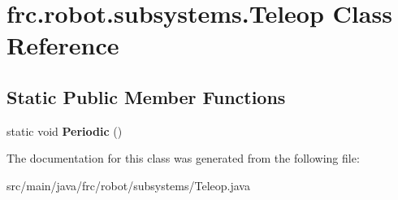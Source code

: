 \hypertarget{classfrc_1_1robot_1_1subsystems_1_1_teleop}{}\section{frc.\+robot.\+subsystems.\+Teleop Class Reference}
\label{classfrc_1_1robot_1_1subsystems_1_1_teleop}
\subsection*{Static Public Member Functions}
\begin{DoxyCompactItemize}
\item 
\mbox{\label{classfrc_1_1robot_1_1subsystems_1_1_teleop_ae90969b779b855da532e50706fa33401}} 
static void {\bfseries Periodic} ()
\end{DoxyCompactItemize}


The documentation for this class was generated from the following file\+:\begin{DoxyCompactItemize}
\item 
src/main/java/frc/robot/subsystems/Teleop.\+java\end{DoxyCompactItemize}
